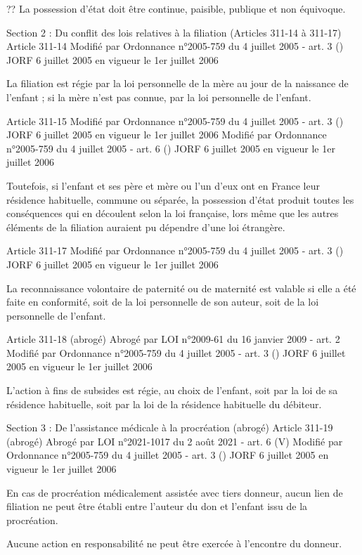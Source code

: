 \documentclass[
  12pt,
]{book}
\begin{document}
\begin{encadre}{??}
La possession d'état doit être continue, paisible, publique et non équivoque.

Section 2 : Du conflit des lois relatives à la filiation (Articles 311-14 à 311-17)
Article 311-14
Modifié par Ordonnance n°2005-759 du 4 juillet 2005 - art. 3 () JORF 6 juillet 2005 en vigueur le 1er juillet 2006

La filiation est régie par la loi personnelle de la mère au jour de la naissance de l'enfant ; si la mère n'est pas connue, par la loi personnelle de l'enfant.

Article 311-15
Modifié par Ordonnance n°2005-759 du 4 juillet 2005 - art. 3 () JORF 6 juillet 2005 en vigueur le 1er juillet 2006
Modifié par Ordonnance n°2005-759 du 4 juillet 2005 - art. 6 () JORF 6 juillet 2005 en vigueur le 1er juillet 2006

Toutefois, si l'enfant et ses père et mère ou l'un d'eux ont en France leur résidence habituelle, commune ou séparée, la possession d'état produit toutes les conséquences qui en découlent selon la loi française, lors même que les autres éléments de la filiation auraient pu dépendre d'une loi étrangère.

Article 311-17
Modifié par Ordonnance n°2005-759 du 4 juillet 2005 - art. 3 () JORF 6 juillet 2005 en vigueur le 1er juillet 2006

La reconnaissance volontaire de paternité ou de maternité est valable si elle a été faite en conformité, soit de la loi personnelle de son auteur, soit de la loi personnelle de l'enfant.

Article 311-18 (abrogé)
Abrogé par LOI n°2009-61 du 16 janvier 2009 - art. 2
Modifié par Ordonnance n°2005-759 du 4 juillet 2005 - art. 3 () JORF 6 juillet 2005 en vigueur le 1er juillet 2006

L'action à fins de subsides est régie, au choix de l'enfant, soit par la loi de sa résidence habituelle, soit par la loi de la résidence habituelle du débiteur.

Section 3 : De l'assistance médicale à la procréation (abrogé)
Article 311-19 (abrogé)
Abrogé par LOI n°2021-1017 du 2 août 2021 - art. 6 (V)
Modifié par Ordonnance n°2005-759 du 4 juillet 2005 - art. 3 () JORF 6 juillet 2005 en vigueur le 1er juillet 2006

En cas de procréation médicalement assistée avec tiers donneur, aucun lien de filiation ne peut être établi entre l'auteur du don et l'enfant issu de la procréation.

Aucune action en responsabilité ne peut être exercée à l'encontre du donneur.


\end{encadre}
\end{document}

